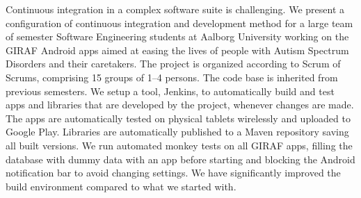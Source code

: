 Continuous integration in a complex software suite is challenging. We present a configuration of continuous integration and development method for a large team of  semester Software Engineering students at Aalborg University working on the GIRAF Android apps aimed at easing the lives of people with Autism Spectrum Disorders and their caretakers. The project is organized according to Scrum of Scrums, comprising 15 groups of 1--4 persons. The code base is inherited from previous semesters. We setup a tool, Jenkins, to automatically build and test apps and libraries that are developed by the project, whenever changes are made. The apps are automatically tested on physical tablets wirelessly and uploaded to Google Play. Libraries are automatically published to a Maven repository saving all built versions. We run automated monkey tests on all GIRAF apps, filling the database with dummy data with an app before starting and blocking the Android notification bar to avoid changing settings. We have significantly improved the build environment compared to what we started with.